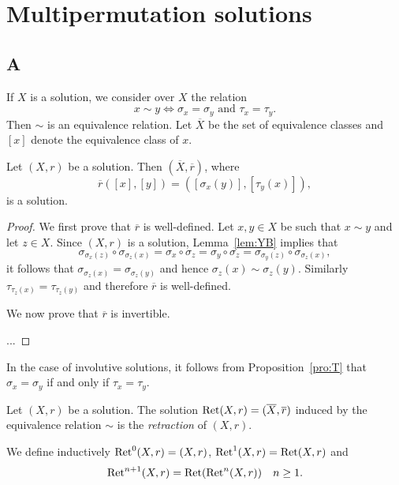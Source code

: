 \chapter{Multipermutation solutions}

\section*{A}

If $X$ is a solution, we 
consider over $X$ the relation
\[
x\sim y\Longleftrightarrow \sigma_x=\sigma_y\text{ and }\tau_x=\tau_y.
\]
Then $\sim$ is an equivalence relation. 
Let $\overline{X}$ be the set of equivalence classes 
and $[x]$ 
denote the equivalence class of $x$. 

\begin{proposition}
Let $(X,r)$ be a solution. Then $(\overline{X},\overline{r})$, where 
\[
\overline{r}([x],[y])=([\sigma_x(y)],[\tau_y(x)]),
\]
is a solution. 
\end{proposition}

\begin{proof}
    We first prove that $\overline{r}$ is well-defined. 
    Let $x,y\in X$ be such that $x\sim y$ and let $z\in X$. Since $(X,r)$ is a solution, 
    Lemma~\ref{lem:YB} implies that 
    \[
    \sigma_{\sigma_x(z)}\circ\sigma_{\sigma_z(x)}=\sigma_x\circ\sigma_z=\sigma_y\circ\sigma_z=\sigma_{\sigma_y(z)}\circ\sigma_{\sigma_z(x)},
    \]
    it follows that $\sigma_{\sigma_z(x)}=\sigma_{\sigma_z(y)}$ and hence $\sigma_z(x)\sim\sigma_z(y)$. 
    Similarly $\tau_{\tau_z(x)}=\tau_{\tau_z(y)}$ and therefore 
    $\overline{r}$ is well-defined. 
    
    We now prove that $\overline{r}$ is invertible. 
    
    ...
\end{proof}

In the case of involutive solutions, it follows from Proposition~\ref{pro:T} 
that $\sigma_x=\sigma_y$ if and only if $\tau_x=\tau_y$. 

\begin{definition}
Let $(X,r)$ be a solution. The solution $\operatorname{Ret}(X,r)=(\overline{X},\overline{r})$ induced
by the equivalence relation $\sim$ is the \emph{retraction} of $(X,r)$.
\end{definition}

We define inductively $\operatorname{Ret}^0(X,r)=(X,r)$, $\operatorname{Ret}^1(X,r)=\operatorname{Ret}(X,r)$ and
\[
\operatorname{Ret}^{n+1}(X,r)=\operatorname{Ret}(\operatorname{Ret}^n(X,r))\quad n\geq1.
\]


